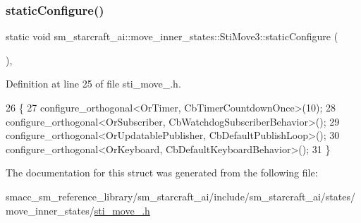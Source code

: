 \subsubsection{\texorpdfstring{static\+Configure()}{staticConfigure()}}
{\footnotesize\ttfamily static void sm\+\_\+starcraft\+\_\+ai\+::move\+\_\+inner\+\_\+states\+::\+Sti\+Move3\+::static\+Configure (\begin{DoxyParamCaption}{ }\end{DoxyParamCaption})\hspace{0.3cm}{\ttfamily [inline]}, {\ttfamily [static]}}



Definition at line 25 of file sti\+\_\+move\+\_.\+h.


\begin{DoxyCode}
26   \{
27     configure\_orthogonal<OrTimer, CbTimerCountdownOnce>(10);
28     configure\_orthogonal<OrSubscriber, CbWatchdogSubscriberBehavior>();
29     configure\_orthogonal<OrUpdatablePublisher, CbDefaultPublishLoop>();
30     configure\_orthogonal<OrKeyboard, CbDefaultKeyboardBehavior>();
31   \}
\end{DoxyCode}


The documentation for this struct was generated from the following file\+:\begin{DoxyCompactItemize}
\item 
smacc\+\_\+sm\+\_\+reference\+\_\+library/sm\+\_\+starcraft\+\_\+ai/include/sm\+\_\+starcraft\+\_\+ai/states/move\+\_\+inner\+\_\+states/\hyperlink{sti__move__3_8h}{sti\+\_\+move\+\_.\+h}\end{DoxyCompactItemize}
